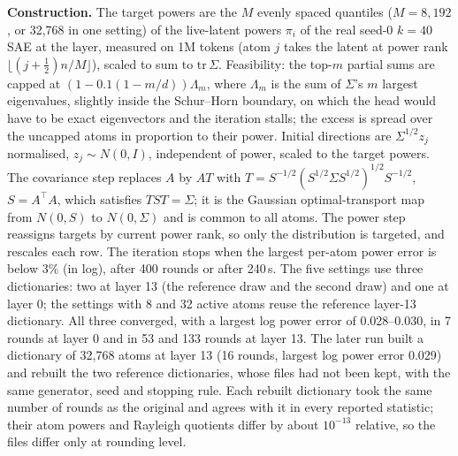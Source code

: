 \documentclass{article}
\newcommand{\Sig}{\Sigma}
\begin{document}
\textbf{Construction.} The target powers are the $M$ evenly spaced quantiles ($M=8{,}192$, or 32,768 in one setting) of the live-latent powers $\pi_i$ of the real seed-0 $k=40$ SAE at the layer, measured on 1M tokens (atom $j$ takes the latent at power rank $\lfloor (j+\frac12)n/M\rfloor$), scaled to sum to $\mathrm{tr}\,\Sig$. Feasibility: the top-$m$ partial sums are capped at $(1-0.1(1-m/d))\Lambda_m$, where $\Lambda_m$ is the sum of $\Sig$'s $m$ largest eigenvalues, slightly inside the Schur--Horn boundary, on which the head would have to be exact eigenvectors and the iteration stalls; the excess is spread over the uncapped atoms in proportion to their power. Initial directions are $\Sig^{1/2}z_j$ normalised, $z_j \sim N(0,I)$, independent of power, scaled to the target powers. The covariance step replaces $A$ by $AT$ with $T = S^{-1/2}(S^{1/2}\Sig S^{1/2})^{1/2}S^{-1/2}$, $S=A^\top A$, which satisfies $TST=\Sig$; it is the Gaussian optimal-transport map from $N(0,S)$ to $N(0,\Sig)$ and is common to all atoms. The power step reassigns targets by current power rank, so only the distribution is targeted, and rescales each row. The iteration stops when the largest per-atom power error is below 3\% (in log), after 400 rounds or after 240\,s. The five settings use three dictionaries: two at layer 13 (the reference draw and the second draw) and one at layer 0; the settings with 8 and 32 active atoms reuse the reference layer-13 dictionary. All three converged, with a largest log power error of 0.028--0.030, in 7 rounds at layer 0 and in 53 and 133 rounds at layer 13. The later run built a dictionary of 32,768 atoms at layer 13 (16 rounds, largest log power error 0.029) and rebuilt the two reference dictionaries, whose files had not been kept, with the same generator, seed and stopping rule. Each rebuilt dictionary took the same number of rounds as the original and agrees with it in every reported statistic; their atom powers and Rayleigh quotients differ by about $10^{-13}$ relative, so the files differ only at rounding level.
\end{document}
